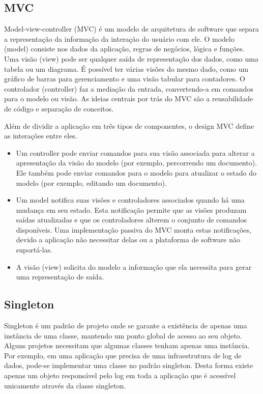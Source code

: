 \subsection{MVC}

Model-view-controller (MVC) é um modelo de arquitetura de software que separa a representação da informação da interação do usuário com ele. O modelo (model) consiste nos dados da aplicação, regras de negócios, lógica e funções. Uma visão (view) pode ser qualquer saída de representação dos dados, como uma tabela ou um diagrama. É possível ter várias visões do mesmo dado, como um gráfico de barras para gerenciamento e uma visão tabular para contadores. O controlador (controller) faz a mediação da entrada, convertendo-a em comandos para o modelo ou visão. As ideias centrais por trás do MVC são a reusabilidade de código e separação de conceitos.

Além de dividir a aplicação em três tipos de componentes, o design MVC define as interações entre eles.

\begin{itemize}
	\item Um controller pode enviar comandos para sua visão associada para alterar a apresentação da visão do modelo (por exemplo, percorrendo um documento). Ele também pode enviar comandos para o modelo para atualizar o estado do modelo (por exemplo, editando um documento).
	\item Um model notifica suas visões e controladores associados quando há uma mudança em seu estado. Esta notificação permite que as visões produzam saídas atualizadas e que os controladores alterem o conjunto de comandos disponíveis. Uma implementação passiva do MVC monta estas notificações, devido a aplicação não necessitar delas ou a plataforma de software não suportá-las.
	\item A visão (view) solicita do modelo a informação que ela necessita para gerar uma representação de saída. 
\end{itemize}

\subsection{Singleton}
Singleton é um padrão de projeto onde se garante a existência de apenas uma instância de uma classe, mantendo um ponto global de acesso ao seu objeto. Alguns projetos necessitam que algumas classes tenham apenas uma instância. Por exemplo, em uma aplicação que precisa de uma infraestrutura de log de dados, pode-se implementar uma classe no padrão singleton. Desta forma existe apenas um objeto responsável pelo log em toda a aplicação que é acessível unicamente através da classe singleton.

